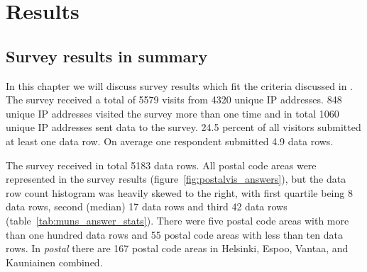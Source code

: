 \section{Results}
\subsection{Survey results in summary}
\justify

In this chapter we will discuss survey results which fit the criteria discussed in \hyperref[sec:processdata]{}. The survey received a total of 5579 visits from 4320 unique IP addresses. 848 unique IP addresses visited the survey more than one time and in total 1060 unique IP addresses sent data to the survey. 24.5 percent of all visitors submitted at least one data row. On average one respondent submitted 4.9 data rows. 

The survey received in total 5183 data rows. All postal code areas were represented in the survey results (figure~\ref{fig:postalvis_answers}), but the data row count histogram was heavily skewed to the right, with first quartile being 8 data rows, second (median) 17 data rows and third 42 data rows (table~\ref{tab:muns_answer_stats}). There were five postal code areas with more than one hundred data rows and 55 postal code areas with less than ten data rows. In \textit{postal} there are 167 postal code areas in Helsinki, Espoo, Vantaa, and Kauniainen combined.

